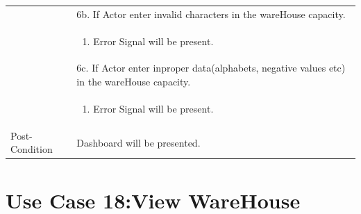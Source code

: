 \documentclass[12pt,a4paper]{article}
\begin{document}
\begin{longtable}{| p{3cm}|p{12cm}|}
& 6b. If Actor enter invalid characters in the wareHouse capacity. \\
& \begin{enumerate}
		\item Error Signal will be present.
	\end{enumerate}
\\ 
& 6c. If Actor enter inproper data(alphabets, negative values etc) in the wareHouse capacity. \\
& \begin{enumerate}
		\item Error Signal will be present.
	\end{enumerate}
\\ \hline 
Post-Condition &  Dashboard will be presented.  \\ \hline

\end{longtable}





\section*{Use Case 18:View WareHouse  }
\end{document}

